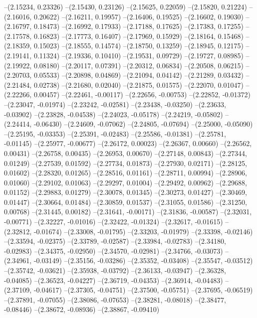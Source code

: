 --(2.15234, 0.23326)
--(2.15430, 0.23126)
--(2.15625, 0.22059)
--(2.15820, 0.21224)
--(2.16016, 0.20622)
--(2.16211, 0.19957)
--(2.16406, 0.19525)
--(2.16602, 0.19030)
--(2.16797, 0.18473)
--(2.16992, 0.17933)
--(2.17188, 0.17625)
--(2.17383, 0.17255)
--(2.17578, 0.16823)
--(2.17773, 0.16407)
--(2.17969, 0.15929)
--(2.18164, 0.15468)
--(2.18359, 0.15023)
--(2.18555, 0.14574)
--(2.18750, 0.13259)
--(2.18945, 0.12175)
--(2.19141, 0.11324)
--(2.19336, 0.10410)
--(2.19531, 0.09729)
--(2.19727, 0.08985)
--(2.19922, 0.08180)
--(2.20117, 0.07391)
--(2.20312, 0.06834)
--(2.20508, 0.06215)
--(2.20703, 0.05533)
--(2.20898, 0.04869)
--(2.21094, 0.04142)
--(2.21289, 0.03432)
--(2.21484, 0.02738)
--(2.21680, 0.02040)
--(2.21875, 0.01575)
--(2.22070, 0.01047)
--(2.22266, 0.00457)
--(2.22461, -0.00117)
--(2.22656, -0.00753)
--(2.22852, -0.01372)
--(2.23047, -0.01974)
--(2.23242, -0.02581)
--(2.23438, -0.03250)
--(2.23633, -0.03902)
--(2.23828, -0.04538)
--(2.24023, -0.05178)
--(2.24219, -0.05802)
--(2.24414, -0.06430)
--(2.24609, -0.07062)
--(2.24805, -0.07694)
--(2.25000, -0.05090)
--(2.25195, -0.03353)
--(2.25391, -0.02483)
--(2.25586, -0.01381)
--(2.25781, -0.01145)
--(2.25977, -0.00677)
--(2.26172, 0.00023)
--(2.26367, 0.00660)
--(2.26562, 0.00431)
--(2.26758, 0.00435)
--(2.26953, 0.00670)
--(2.27148, 0.00843)
--(2.27344, 0.01249)
--(2.27539, 0.01592)
--(2.27734, 0.01873)
--(2.27930, 0.02171)
--(2.28125, 0.01602)
--(2.28320, 0.01265)
--(2.28516, 0.01161)
--(2.28711, 0.00994)
--(2.28906, 0.01060)
--(2.29102, 0.01063)
--(2.29297, 0.01004)
--(2.29492, 0.00962)
--(2.29688, 0.01152)
--(2.29883, 0.01279)
--(2.30078, 0.01345)
--(2.30273, 0.01427)
--(2.30469, 0.01447)
--(2.30664, 0.01484)
--(2.30859, 0.01537)
--(2.31055, 0.01586)
--(2.31250, 0.00768)
--(2.31445, 0.00182)
--(2.31641, -0.00171)
--(2.31836, -0.00587)
--(2.32031, -0.00771)
--(2.32227, -0.01016)
--(2.32422, -0.01324)
--(2.32617, -0.01615)
--(2.32812, -0.01674)
--(2.33008, -0.01795)
--(2.33203, -0.01979)
--(2.33398, -0.02146)
--(2.33594, -0.02375)
--(2.33789, -0.02587)
--(2.33984, -0.02783)
--(2.34180, -0.02983)
--(2.34375, -0.02950)
--(2.34570, -0.02981)
--(2.34766, -0.03073)
--(2.34961, -0.03149)
--(2.35156, -0.03286)
--(2.35352, -0.03408)
--(2.35547, -0.03512)
--(2.35742, -0.03621)
--(2.35938, -0.03792)
--(2.36133, -0.03947)
--(2.36328, -0.04085)
--(2.36523, -0.04227)
--(2.36719, -0.04353)
--(2.36914, -0.04483)
--(2.37109, -0.04617)
--(2.37305, -0.04751)
--(2.37500, -0.05751)
--(2.37695, -0.06519)
--(2.37891, -0.07055)
--(2.38086, -0.07653)
--(2.38281, -0.08018)
--(2.38477, -0.08446)
--(2.38672, -0.08936)
--(2.38867, -0.09410)
